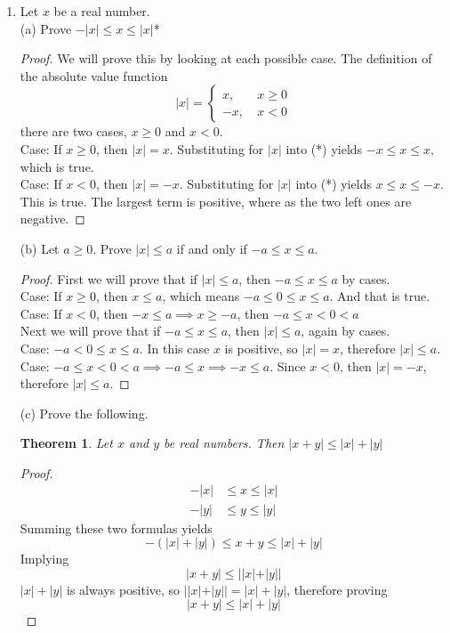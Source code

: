 \documentclass[12pt]{article}
\newtheorem{theorem1}{Theorem}
\begin{document}
\begin{enumerate}
		\item Let $x$ be a real number.\\
			(a) Prove $-|x|\leq x\leq |x|$*
			\begin{proof}
				We will prove this by looking at each possible case. The definition of the absolute value function
				\[ |x| = \left\{
				\begin{array}{rl}
				x, & \  x \geq 0 \\
				-x, & \  x < 0
				\end{array}\right.
				\]
				there are two cases, $x\geq 0$ and $x<0$.\\
				Case: If $x\geq 0$, then $|x|=x$. Substituting for $|x|$ into (*) yields $-x\leq x\leq x$, which is true.\\
				Case: If $x<0$, then $|x|=-x$. Substituting for $|x|$ into (*) yields $x\leq x\leq -x$. This is true. The largest term is positive, where as the two left ones are negative.
			\end{proof}
		
			(b) Let $a\geq 0$. Prove $|x|\leq a$ if and only if $-a\leq x\leq a$.
			\begin{proof}
				First we will prove that if $|x|\leq a$, then $-a\leq x\leq a$ by cases.\\
				Case: If $x\geq 0$, then $x\leq a$, which means $-a\leq 0\leq x\leq a$. And that is true.\\
				Case: If $x<0$, then $-x\leq a\implies x\geq -a$, then $-a\leq x< 0<a$\\
				Next we will prove that if $-a\leq x\leq a$, then $|x|\leq a$, again by cases.\\
				Case: $-a<0\leq x\leq a$. In this case $x$ is positive, so $|x|=x$, therefore $|x|\leq a$.\\
				Case: $-a\leq x<0<a\implies -a\leq x\implies -x\leq a$. Since $x<0$, then $|x|=-x$, therefore $|x|\leq a$.
			\end{proof}
		\newpage
			(c) Prove the following.
			\begin{theorem1}
				Let $x$ and $y$ be real numbers. Then
				$|x+y|\leq|x|+|y|$
			\end{theorem1}
			\begin{proof}
				\begin{align*}
					-|x|&\leq x\leq |x|\\
					-|y|&\leq y\leq |y|
				\end{align*}
				Summing these two formulas yields
				\[
					-(|x|+|y|)\leq x+y\leq |x|+|y|
				\]
				Implying
				\[
					|x+y|\leq ||x|+|y||
				\]
				$|x|+|y|$ is always positive, so $||x|+|y||=|x|+|y|$, therefore proving
				\[
					|x+y|\leq |x|+|y|
				\]
			\end{proof}
			

\end{enumerate}
\end{document}

